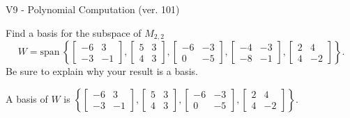 \begin{exercise}
  \begin{exerciseTitle}V9 - Polynomial Computation (ver. 101)\end{exerciseTitle}
  \begin{exerciseStatement}
    Find a basis for the subspace of \(M_{2,2}\) 
\[W=\mathrm{span}\ \left\{\left[\begin{array}{cc}
-6 & 3 \\
-3 & -1
\end{array}\right] , \left[\begin{array}{cc}
5 & 3 \\
4 & 3
\end{array}\right] , \left[\begin{array}{cc}
-6 & -3 \\
0 & -5
\end{array}\right] , \left[\begin{array}{cc}
-4 & -3 \\
-8 & -1
\end{array}\right] , \left[\begin{array}{cc}
2 & 4 \\
4 & -2
\end{array}\right]\right\}.\]
 Be sure to explain why your result is a basis.


  \end{exerciseStatement}
  \begin{exerciseAnswer}
   A basis of \(W\) is  \(\left\{\left[\begin{array}{cc}
-6 & 3 \\
-3 & -1
\end{array}\right] , \left[\begin{array}{cc}
5 & 3 \\
4 & 3
\end{array}\right] , \left[\begin{array}{cc}
-6 & -3 \\
0 & -5
\end{array}\right] , \left[\begin{array}{cc}
2 & 4 \\
4 & -2
\end{array}\right]\right\}\).
  


  \end{exerciseAnswer}
\end{exercise}